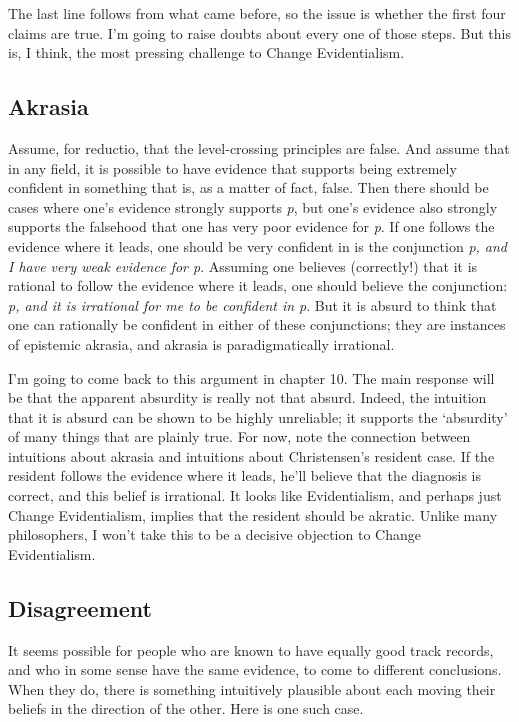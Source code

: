 \documentclass[
  10pt,
  letterpaper,
  twoside]{scrbook}
\begin{document}
The last line follows from what came before, so the issue is whether the
first four claims are true. I'm going to raise doubts about every one of
those steps. But this is, I think, the most pressing challenge to Change
Evidentialism.

\subsection{Akrasia}\label{akrasia}

Assume, for reductio, that the level-crossing principles are false. And
assume that in any field, it is possible to have evidence that supports
being extremely confident in something that is, as a matter of fact,
false. Then there should be cases where one's evidence strongly supports
\emph{p}, but one's evidence also strongly supports the falsehood that
one has very poor evidence for \emph{p}. If one follows the evidence
where it leads, one should be very confident in is the conjunction
\emph{p, and I have very weak evidence for p}. Assuming one believes
(correctly!) that it is rational to follow the evidence where it leads,
one should believe the conjunction: \emph{p, and it is irrational for me
to be confident in p}. But it is absurd to think that one can rationally
be confident in either of these conjunctions; they are instances of
epistemic akrasia, and akrasia is paradigmatically irrational.

I'm going to come back to this argument in chapter 10. The main response
will be that the apparent absurdity is really not that absurd. Indeed,
the intuition that it is absurd can be shown to be highly unreliable; it
supports the `absurdity' of many things that are plainly true. For now,
note the connection between intuitions about akrasia and intuitions
about Christensen's resident case. If the resident follows the evidence
where it leads, he'll believe that the diagnosis is correct, and this
belief is irrational. It looks like Evidentialism, and perhaps just
Change Evidentialism, implies that the resident should be akratic.
Unlike many philosophers, I won't take this to be a decisive objection
to Change Evidentialism.

\subsection{Disagreement}\label{disagreement}

It seems possible for people who are known to have equally good track
records, and who in some sense have the same evidence, to come to
different conclusions. When they do, there is something intuitively
plausible about each moving their beliefs in the direction of the other.
Here is one such case.
\end{document}
